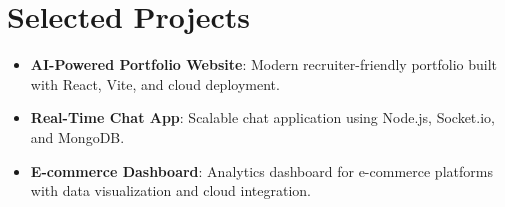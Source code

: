 \documentclass[a4paper,10pt]{article}
\begin{document}
\section*{Selected Projects}
\begin{itemize}[leftmargin=*]
    \item \textbf{AI-Powered Portfolio Website}: Modern recruiter-friendly portfolio built with React, Vite, and cloud deployment.
    \item \textbf{Real-Time Chat App}: Scalable chat application using Node.js, Socket.io, and MongoDB.
    \item \textbf{E-commerce Dashboard}: Analytics dashboard for e-commerce platforms with data visualization and cloud integration.
\end{itemize}
\end{document}
